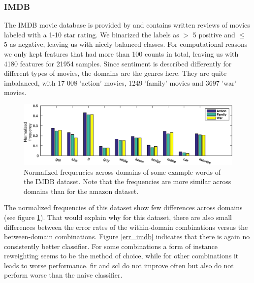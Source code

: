 \documentclass[twoside,11pt]{article}
\begin{document}
\subsubsection{IMDB}
The IMDB movie database is provided by \cite{maas2011learning} and contains written reviews of movies labeled with a 1-10 star rating. We binarized the labels as $>$ 5 positive and $\leq$ 5 as negative, leaving us with nicely balanced classes. For computational reasons we only kept features that had more than 100 counts in total, leaving us with 4180 features for 21954 samples. Since sentiment is described differently for different types of movies, the domains are the genres here. They are quite imbalanced, with 17 008 'action' movies, 1249 'family' movies and 3697 'war' movies.
					
\begin{figure}[ht]
\centering
\includegraphics[width=.9\textwidth]{images/eg_imdb.eps}
\caption{Normalized frequencies across domains of some example words of the IMDB dataset. Note that the frequencies are more similar across domains than for the amazon dataset.}
\label{eg_imdb}
\end{figure}

The normalized frequencies of this dataset show few differences across domains (see figure \ref{eg_imdb}). That would explain why for this dataset, there are also small differences between the error rates of the within-domain combinations versus the between-domain combinations. Figure \ref{err_imdb} indicates that there is again no consistently better classifier. For some combinations a form of instance reweighting seems to be the method of choice, while for other combinations it leads to worse performance. {\sc fir} and {\sc scl} do not improve often but also do not perform worse than the naive classifier.
																
\end{document}
